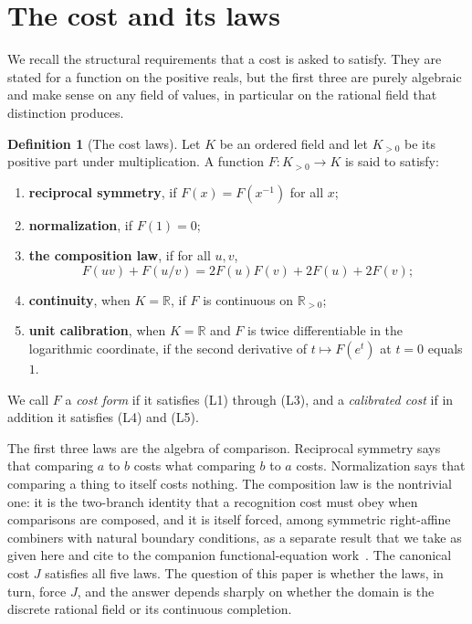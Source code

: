 \documentclass[11pt,a4paper]{article}
\theoremstyle{definition}
\newtheorem{definition}[theorem]{Definition}
\theoremstyle{remark}
\newcommand{\Rpos}{\mathbb{R}_{>0}}
\begin{document}
\section{The cost and its laws}

We recall the structural requirements that a cost is asked to satisfy. They are
stated for a function on the positive reals, but the first three are purely
algebraic and make sense on any field of values, in particular on the rational
field that distinction produces.

\begin{definition}[The cost laws]\label{def:laws}
Let $K$ be an ordered field and let $K_{>0}$ be its positive part under
multiplication. A function $F \colon K_{>0} \to K$ is said to satisfy:
\begin{enumerate}[leftmargin=2.6em, label=\textup{(L\arabic*)}]
  \item \textbf{reciprocal symmetry}, if $F(x) = F(x^{-1})$ for all $x$;
  \item \textbf{normalization}, if $F(1) = 0$;
  \item \textbf{the composition law}, if for all $u, v$,
    \[
      F(uv) + F(u/v) = 2F(u)F(v) + 2F(u) + 2F(v) ;
    \]
  \item \textbf{continuity}, when $K = \mathbb{R}$, if $F$ is continuous on
    $\Rpos$;
  \item \textbf{unit calibration}, when $K = \mathbb{R}$ and $F$ is twice
    differentiable in the logarithmic coordinate, if the second derivative of
    $t \mapsto F(e^{t})$ at $t = 0$ equals $1$.
\end{enumerate}
We call $F$ a \emph{cost form} if it satisfies (L1) through (L3), and a
\emph{calibrated cost} if in addition it satisfies (L4) and (L5).
\end{definition}

The first three laws are the algebra of comparison. Reciprocal symmetry says
that comparing $a$ to $b$ costs what comparing $b$ to $a$ costs. Normalization
says that comparing a thing to itself costs nothing. The composition law is the
nontrivial one: it is the two-branch identity that a recognition cost must obey
when comparisons are composed, and it is itself forced, among symmetric
right-affine combiners with natural boundary conditions, as a separate result
that we take as given here and cite to the companion functional-equation
work~\cite{WashburnFE2026}. The canonical cost $J$ satisfies all five laws. The
question of this paper is whether the laws, in turn, force $J$, and the answer
depends sharply on whether the domain is the discrete rational field or its
continuous completion.
\end{document}
